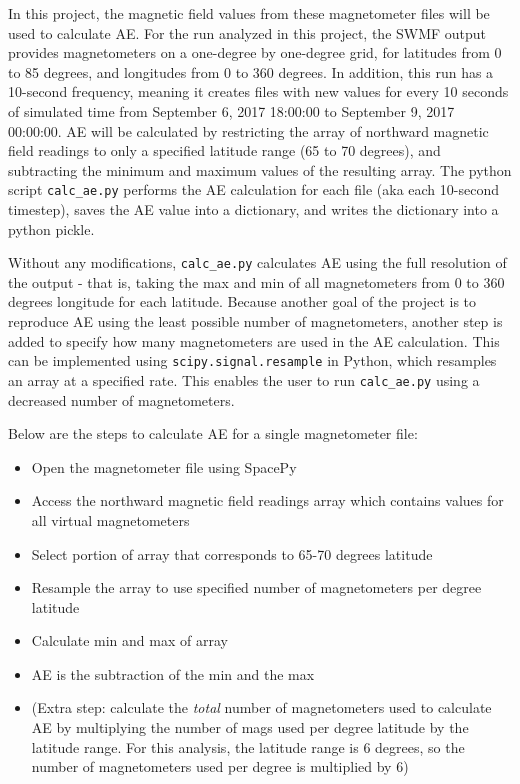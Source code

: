 \documentclass[12pt, letterpaper]{article}
\begin{document}
In this project, the magnetic field values from these magnetometer files will be used to calculate AE. For the run analyzed in this project, the SWMF output provides magnetometers on a one-degree by one-degree grid, for latitudes from 0 to 85 degrees, and longitudes from 0 to 360 degrees. In addition, this run has a 10-second frequency, meaning it creates files with new values for every 10 seconds of simulated time from September 6, 2017 18:00:00 to September 9, 2017 00:00:00.
AE will be calculated by restricting the array of northward magnetic field readings to only a specified latitude range (65 to 70 degrees), and subtracting the minimum and maximum values of the resulting array. The python script \texttt{calc\_ae.py} performs the AE calculation for each file (aka each 10-second timestep), saves the AE value into a dictionary, and writes the dictionary into a python pickle.

Without any modifications, \texttt{calc\_ae.py} calculates AE using the full resolution of the output - that is, taking the max and min of all magnetometers from 0 to 360 degrees longitude for each latitude. Because another goal of the project is to reproduce AE using the least possible number of magnetometers, another step is added to specify how many magnetometers are used in the AE calculation. This can be implemented using \texttt{scipy.signal.resample} in Python, which resamples an array at a specified rate. This enables the user to run \texttt{calc\_ae.py} using a decreased number of magnetometers.

Below are the steps to calculate AE for a single magnetometer file:
\begin{itemize}
  \item Open the magnetometer file using SpacePy
  \item Access the northward magnetic field readings array which contains values for all virtual magnetometers
  \item Select portion of array that corresponds to 65-70 degrees latitude
  \item Resample the array to use specified number of magnetometers per degree latitude
  \item Calculate min and max of array
  \item AE is the subtraction of the min and the max
  \item (Extra step: calculate the \textit{total} number of magnetometers used to calculate AE by multiplying the number of mags used per degree latitude by the latitude range. For this analysis, the latitude range is 6 degrees, so the number of magnetometers used per degree is multiplied by 6)
\end{itemize}
\end{document}
